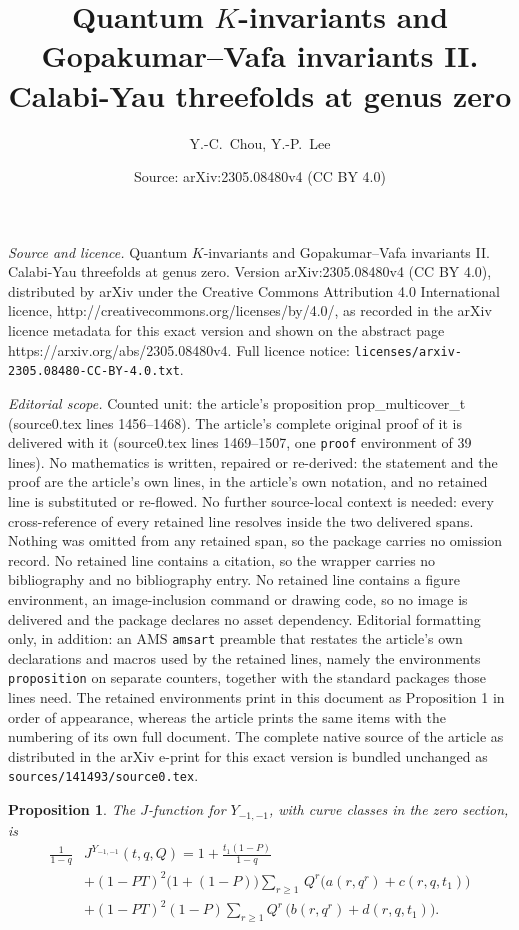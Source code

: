 \documentclass[10pt,a4paper]{amsart}
\title{Quantum $K$-invariants and Gopakumar--Vafa invariants II. \\ Calabi-Yau threefolds at genus zero}
\author{Y.-C.~Chou, Y.-P.~Lee}
\date{Source: arXiv:2305.08480v4 (CC BY 4.0)}
\newtheorem{proposition}{Proposition}
\begin{document}
\maketitle

\noindent\emph{Source and licence.} Quantum $K$-invariants and Gopakumar--Vafa invariants II. \\ Calabi-Yau threefolds at genus zero. Version arXiv:2305.08480v4 (CC BY 4.0), distributed by arXiv under the Creative Commons Attribution 4.0 International licence, http://creativecommons.org/licenses/by/4.0/, as recorded in the arXiv licence metadata for this exact version and shown on the abstract page https://arxiv.org/abs/2305.08480v4. Full licence notice: \texttt{licenses/arxiv-2305.08480-CC-BY-4.0.txt}.\par\smallskip

\noindent\textit{Editorial scope.} Counted unit: the article's proposition prop\_multicover\_t (source0.tex lines 1456--1468). The article's complete original proof of it is delivered with it (source0.tex lines 1469--1507, one \texttt{proof} environment of 39 lines). No mathematics is written, repaired or re-derived: the statement and the proof are the article's own lines, in the article's own notation, and no retained line is substituted or re-flowed.  No further source-local context is needed: every cross-reference of every retained line resolves inside the two delivered spans.  Nothing was omitted from any retained span, so the package carries no omission record.  No retained line contains a citation, so the wrapper carries no bibliography and no bibliography entry.  No retained line contains a figure environment, an image-inclusion command or drawing code, so no image is delivered and the package declares no asset dependency.  Editorial formatting only, in addition: an AMS \texttt{amsart} preamble that restates the article's own declarations and macros used by the retained lines, namely the environments \texttt{proposition} on separate counters, together with the standard packages those lines need.  The retained environments print in this document as Proposition 1 in order of appearance, whereas the article prints the same items with the numbering of its own full document.  The complete native source of the article as distributed in the arXiv e-print for this exact version is bundled unchanged as \texttt{sources/141493/source0.tex}.
\begin{proposition} \label{prop_multicover_t}
The $J$-function for %
$Y_{-1,-1}$, with curve classes in the zero section, is 
\begin{equation} \label{e:4.3}
\begin{split}
\frac{1}{1-q} & J^{Y_{-1,-1}}(t, q, Q) = 1 + \frac{t_1(1-P)}{1-q}
\\
&+  (1-PT)^2\Big(1 +(1-P)\Big)\sum_{r \geq 1} \, Q^r\Big( a(r, q^r) + c(r,q, t_1) \Big) %
\\
& + (1-PT)^2(1-P) \sum_{r\geq 1} Q^r \, \Big( b(r, q^r) + d(r,q, t_1) \Big) . %
\end{split} 
\end{equation}
\end{proposition}
\end{document}
